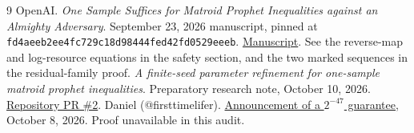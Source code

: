 \documentclass[11pt]{article}
\begin{document}
\begin{thebibliography}{9}
 OpenAI.
\emph{One Sample Suffices for Matroid Prophet Inequalities against an
Almighty Adversary}. September 23, 2026 manuscript, pinned at
\texttt{fd4aeeb2ee4fc729c18d98444fed42fd0529eeeb}.
\href{https://github.com/openai/math/blob/fd4aeeb2ee4fc729c18d98444fed42fd0529eeeb/preprints/One-Sample-Suffices-for-Matroid-Prophet-Inequalities-against-an-Almighty-Adversary-September-23-2026/final.pdf}{Manuscript}.
See the reverse-map and log-resource equations in the safety section,
and the two marked sequences in the residual-family proof.
 \emph{A finite-seed parameter refinement for one-sample
matroid prophet inequalities}. Preparatory research note, October 10, 2026.
\href{https://github.com/shea256/open-math-problems/pull/2}{Repository PR \#2}.
 Daniel (@firsttimelifer).
\href{https://x.com/firsttimelifer/status/2108282829809541468}{Announcement
of a $2^{-47}$ guarantee}, October 8, 2026. Proof unavailable in this audit.
\end{thebibliography}
\end{document}

